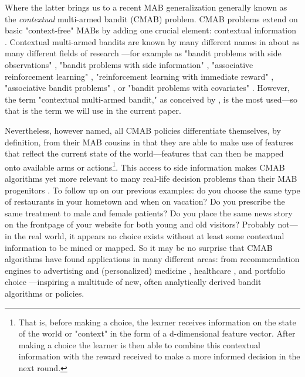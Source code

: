 \documentclass{jss}
\begin{document}
Where the latter brings us to a recent MAB generalization generally known as the \textit{contextual} multi-armed bandit (CMAB) problem. CMAB problems extend on basic "context-free" MABs by adding one crucial element: contextual information \citep{Langford2008}. Contextual multi-armed bandits are known by many different names in about as many different fields of research \citep{Tewari2017}---for example as "bandit problems with side observations" \citep{Wang2005a}, "bandit problems with side information" \citep{Lu2010}, "associative reinforcement learning" \citep{Kaelbling1996}, "reinforcement learning with immediate reward" \citep{Abe2003}, "associative bandit problems" \citep{Strehl2006}, or "bandit problems with covariates" \citep{Sarkar1991}. However, the term "contextual multi-armed bandit," as conceived by \cite{Langford2008}, is the most used---so that is the term we will use in the current paper.

Nevertheless, however named, all CMAB policies differentiate themselves, by definition, from their MAB cousins in that they are able to make use of features that reflect the current state of the world---features that can then be mapped onto available arms or actions\footnote{That is, before making a choice, the learner receives information on the state of the world or "context" in the form of a d-dimensional feature vector. After making a choice the learner is then able to combine this contextual information with the reward received to make a more informed decision in the next round.}. This access to side information makes CMAB algorithms yet more relevant to many real-life decision problems than their MAB progenitors \citep{Langford2008}. To follow up on our previous examples: do you choose the same  type of restaurants in your hometown and when on vacation? Do you prescribe the same treatment to male and female patients? Do you place the same news story on the frontpage of your website for both young and old visitors? Probably not---in the real world, it appears no choice exists without at least some contextual information to be mined or mapped. So it may be no surprise that CMAB algorithms have found applications in many different areas: from recommendation engines \citep{Lai1985} to advertising \citep{Tang2013} and (personalized) medicine \citep{Tewari2017}, healthcare \citep{Rabbi2015}, and portfolio choice \citep{Shen2015}---inspiring a multitude of new, often analytically derived bandit algorithms or policies.
\end{document}
